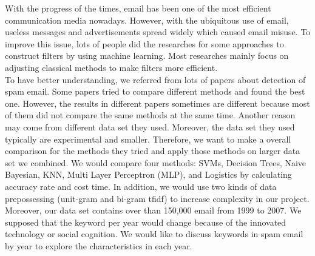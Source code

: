 
With the progress of the times, email has been one of the most efficient communication media nowadays. However, with the ubiquitous use of email, useless messages and advertisements spread widely which caused email misuse. To improve this issue, lots of people did the researches for some approaches to construct filters by using machine learning. Most researches mainly focus on adjusting classical methods to make filters more efficient.\\

To have better understanding, we referred from lots of papers about detection of spam email. Some papers tried to compare different methods and found the best one. However, the results in different papers sometimes are different because most of them did not compare the same methods at the same time. Another reason may come from different data set they used. Moreover, the data set they used typically are experimental and smaller. Therefore, we want to make a overall comparison for the methods they tried and apply those methods on larger data set we combined. We would compare four methods: SVMs, Decision Trees, Naive Bayesian, KNN, Multi Layer Perceptron (MLP), and Logistics by calculating accuracy rate and cost time. In addition, we would use two kinds of data prepossessing (unit-gram and bi-gram tfidf) to increase complexity in our project.\\

Moreover, our data set contains over than 150,000 email from 1999 to 2007. We supposed that the keyword per year would change because of the innovated technology or social cognition. We would like to discuss keywords in spam email by year to explore the characteristics in each year.\\


